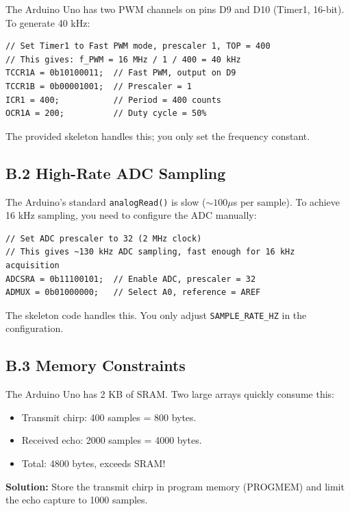 \documentclass[11pt,letterpaper]{article}
\begin{document}
The Arduino Uno has two PWM channels on pins D9 and D10 (Timer1, 16-bit). To generate 40 kHz:

\begin{verbatim}
// Set Timer1 to Fast PWM mode, prescaler 1, TOP = 400
// This gives: f_PWM = 16 MHz / 1 / 400 = 40 kHz
TCCR1A = 0b10100011;  // Fast PWM, output on D9
TCCR1B = 0b00001001;  // Prescaler = 1
ICR1 = 400;           // Period = 400 counts
OCR1A = 200;          // Duty cycle = 50%
\end{verbatim}

The provided skeleton handles this; you only set the frequency constant.

\subsection*{B.2 High-Rate ADC Sampling}

The Arduino's standard \texttt{analogRead()} is slow ($\sim 100 \mu$s per sample). To achieve 16 kHz sampling, you need to configure the ADC manually:

\begin{verbatim}
// Set ADC prescaler to 32 (2 MHz clock)
// This gives ~130 kHz ADC sampling, fast enough for 16 kHz acquisition
ADCSRA = 0b11100101;  // Enable ADC, prescaler = 32
ADMUX = 0b01000000;   // Select A0, reference = AREF
\end{verbatim}

The skeleton code handles this. You only adjust \texttt{SAMPLE\_RATE\_HZ} in the configuration.

\subsection*{B.3 Memory Constraints}

The Arduino Uno has 2 KB of SRAM. Two large arrays quickly consume this:
\begin{itemize}
    \item Transmit chirp: 400 samples = 800 bytes.
    \item Received echo: 2000 samples = 4000 bytes.
    \item Total: 4800 bytes, exceeds SRAM!
\end{itemize}

\noindent
\textbf{Solution:} Store the transmit chirp in program memory (PROGMEM) and limit the echo capture to 1000 samples.

\clearpage

\end{document}
